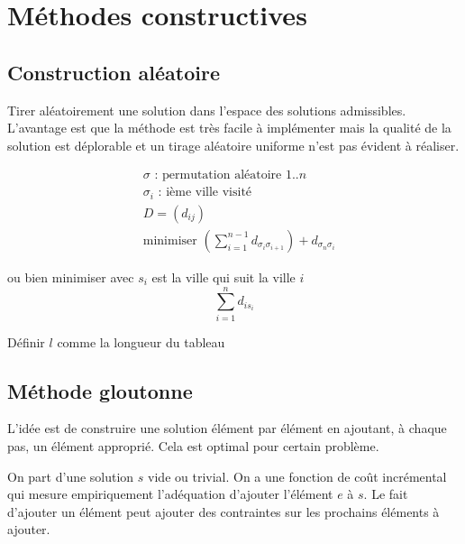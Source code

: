 \documentclass[11pt,a4paper]{report}
\begin{document}
\chapter{Méthodes constructives}

\section{Construction aléatoire}
Tirer aléatoirement une solution dans l'espace des solutions admissibles. L'avantage est que la méthode est très facile à implémenter mais la qualité de la solution est déplorable et un tirage aléatoire uniforme n'est pas évident à réaliser.

\begin{align*}
& \sigma \text{ : permutation aléatoire } 1..n \\
& \sigma_i \text{ : ième ville visité}\\
& D = (d_{ij})\\
& \text{minimiser } (\sum_{i=1}^{n-1} d_{\sigma_i \sigma_{i+1}}) + d_{\sigma_n \sigma_i}
\end{align*}

ou bien minimiser avec $s_i$ est la ville qui suit la ville $i$
$$
\sum_{i=1}^n d_{i s_i}
$$

\begin{algorithm}[H]
Définir $l$ comme la longueur du tableau\;
\end{algorithm}

\section{Méthode gloutonne}

L'idée est de construire une solution élément par élément en ajoutant, à chaque pas, un élément approprié. Cela est optimal pour certain problème.

On part d'une solution $s$ vide ou trivial. On a une fonction de coût incrémental qui mesure empiriquement l'adéquation d'ajouter l'élément $e$ à $s$. Le fait d'ajouter un élément peut ajouter des contraintes sur les prochains éléments à ajouter.

\begin{algorithm}[H]

\end{algorithm}
\end{document}
